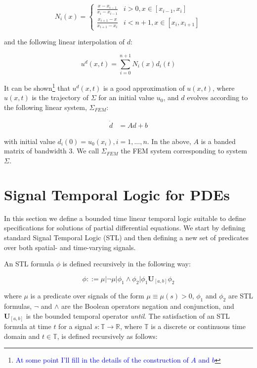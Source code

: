 \documentclass{article}
\newcommand*{\R}{\mathbb{R}}
\newcommand{\luntil}{\mathbf{U}}
\newcommand*{\fran}[1]{\textcolor{blue}{#1}}
\begin{document}
\begin{equation}
    N_i(x) = \begin{cases}
        \frac{x - x_{i - 1}}{x_i - x_{i - 1}} & i > 0, x \in [x_{i-1}, x_i] \\
        \frac{x_{i+1} - x}{x_{i+1} - x_{i}} & i < n+1, x \in [x_{i}, x_{i+1}] 
    \end{cases} 
\end{equation}

and the following linear interpolation of $d$:

\begin{equation}
    u^d(x, t) = \sum_{i=0}^{n+1} N_i(x) d_i(t)
\end{equation}

It can be shown\footnote{\fran{At some point I'll fill in the details of the
construction of $A$ and $b$}} that $u^d(x, t)$ is a good approximation of 
$u(x, t)$, where $u(x,t)$ is the trajectory of $\Sigma$ for an
initial value $u_0$, and $d$ evolves
according to the following linear system, $\Sigma_{FEM}$:

\begin{equation}\label{eq:fem}
    \begin{aligned}
        \dot{d} &= A d + b
    \end{aligned}
\end{equation}

with initial value $d_i(0) = u_0(x_i), i = 1,...,n$. In the above, $A$ is a
banded matrix of bandwidth 3. We call $\Sigma_{FEM}$ the FEM system
corresponding to system $\Sigma$.


\section{Signal Temporal Logic for PDEs}
\label{sec:signal_temporal_logic}

In this section we define a bounded time linear temporal logic suitable to
define specifications for solutions of partial differential equations. We start
by defining standard Signal Temporal Logic (STL) and then defining a new set of
predicates over both spatial- and time-varying signals.

An STL formula $\phi$ is defined recursively in the following way:

\begin{equation}
    \phi ::= \mu | \lnot \mu | \phi_1 \land \phi_2 | \phi_1 \luntil_{[a,b]} \phi_2
\end{equation}

where $\mu$ is a predicate over signals of the form $\mu \equiv \mu(s) > 0$,
$\phi_1$ and $\phi_2$ are STL formulas,
$\lnot$ and $\land$ are the Boolean operators negation and conjunction, and
$\luntil_{[a, b]}$ is the bounded temporal operator \emph{until}. The satisfaction
of an STL formula at time $t$ for a signal $s :
\mathbb{T} \to \R$, where $\mathbb{T}$ is a discrete or continuous time domain
and $t \in \mathbb{T}$, is defined recursively as follows:
\end{document}
